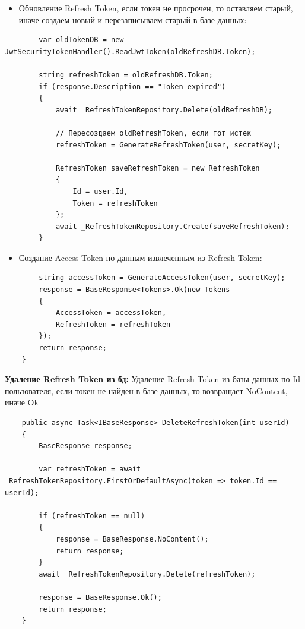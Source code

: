 \begin{itemize}
	\item{Обновление Refresh Token, если токен не просрочен, то оставляем старый, иначе создаем новый и перезаписываем старый в базе данных:}
\end{itemize}
\begin{verbatim}
        var oldTokenDB = new JwtSecurityTokenHandler().ReadJwtToken(oldRefreshDB.Token);

        string refreshToken = oldRefreshDB.Token;
        if (response.Description == "Token expired")
        {
            await _RefreshTokenRepository.Delete(oldRefreshDB);

            // Пересоздаем oldRefreshToken, если тот истек
            refreshToken = GenerateRefreshToken(user, secretKey);

            RefreshToken saveRefreshToken = new RefreshToken
            {
                Id = user.Id,
                Token = refreshToken
            };
            await _RefreshTokenRepository.Create(saveRefreshToken);
        }
\end{verbatim}

\begin{itemize}
	\item{Создание Access Token по данным извлеченным из Refresh Token:}
\end{itemize}
\begin{verbatim}
        string accessToken = GenerateAccessToken(user, secretKey);
        response = BaseResponse<Tokens>.Ok(new Tokens
        {
            AccessToken = accessToken,
            RefreshToken = refreshToken
        });
        return response;
    }
\end{verbatim}

\textbf{Удаление Refresh Token из бд:} Удаление Refresh Token из базы данных по Id пользователя, если токен не найден в базе данных, то возвращает NoContent, иначе Ok
\begin{verbatim}
    public async Task<IBaseResponse> DeleteRefreshToken(int userId)
    {
        BaseResponse response;

        var refreshToken = await _RefreshTokenRepository.FirstOrDefaultAsync(token => token.Id == userId);

        if (refreshToken == null)
        {
            response = BaseResponse.NoContent();
            return response;
        }
        await _RefreshTokenRepository.Delete(refreshToken);

        response = BaseResponse.Ok();
        return response;
    }
\end{verbatim}

